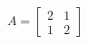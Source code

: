 \documentclass[preview]{standalone}
\begin{document}
\begin{align*}
A = \begin{bmatrix} 2 & 1 \\ 1 & 2 \end{bmatrix}
\end{align*}
\end{document}
